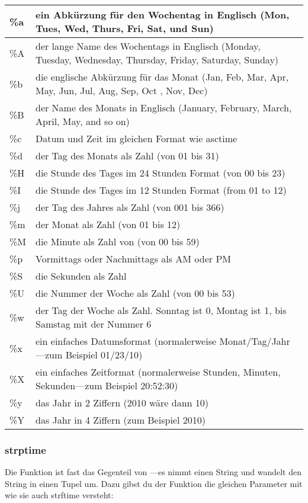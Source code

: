 \begin{center}
\begin{tabular}{|l|p{12cm}|}
\hline
\%a & ein Abkürzung für den Wochentag in Englisch (Mon, Tues, Wed, Thurs, Fri, Sat, und Sun) \\
\hline
\%A & der lange Name des Wochentags in Englisch (Monday, Tuesday, Wednesday, Thursday, Friday, Saturday, Sunday) \\
\hline
\%b & die englische Abkürzung für das Monat (Jan, Feb, Mar, Apr, May, Jun, Jul, Aug, Sep, Oct , Nov, Dec) \\
\hline
\%B & der Name des Monats in Englisch (January, February, March, April, May, and so on) \\
\hline
\%c & Datum und Zeit im gleichen Format wie asctime \\
\hline
\%d & der Tag des Monats als Zahl (von 01 bis 31) \\
\hline
\%H & die Stunde des Tages im 24 Stunden Format (von 00 bis 23) \\
\hline
\%I & die Stunde des Tages im 12 Stunden Format (from 01 to 12) \\
\hline
\%j & der Tag des Jahres als Zahl (von 001 bis 366) \\
\hline
\%m & der Monat als Zahl (von 01 bis 12) \\
\hline
\%M & die Minute als Zahl von (von 00 bis 59) \\
\hline
\%p & Vormittags oder Nachmittags als AM oder PM \\
\hline
\%S & die Sekunden als Zahl \\
\hline
\%U & die Nummer der Woche als Zahl (von 00 bis 53) \\
\hline
\%w & der Tag der Woche als Zahl. Sonntag ist 0, Montag ist 1, bis Samstag mit der Nummer 6 \\
\hline
\%x & ein einfaches Datumsformat (normalerweise Monat/Tag/Jahr---zum Beispiel 01/23/10) \\
\hline
\%X & ein einfaches Zeitformat (normalerweise Stunden, Minuten, Sekunden---zum Beispiel 20:52:30) \\
\hline
\%y & das Jahr in 2 Ziffern (2010 wäre dann 10) \\
\hline
\%Y & das Jahr in 4 Ziffern (zum Beispiel 2010) \\
\hline
\end{tabular}
\end{center}


\subsubsection*{strptime}
Die Funktion  ist fast das Gegenteil von ---es nimmt einen String und wandelt den String in einen Tupel um. Dazu gibst du der Funktion die gleichen Parameter mit wie sie auch strftime versteht:

